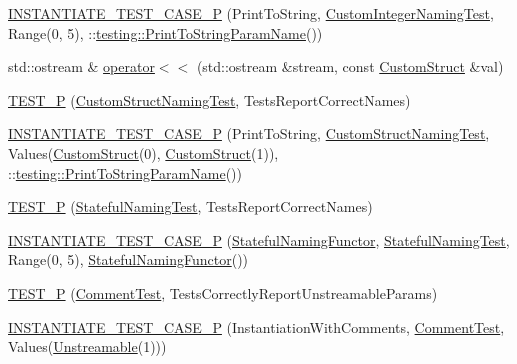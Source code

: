 \begin{DoxyCompactItemize}
\item 
\mbox{\hyperlink{googletest-param-test-test_8cc_a17fa3cbf3d7012f451beed5c2ce6d0d9}{I\+N\+S\+T\+A\+N\+T\+I\+A\+T\+E\+\_\+\+T\+E\+S\+T\+\_\+\+C\+A\+S\+E\+\_\+P}} (Print\+To\+String, \mbox{\hyperlink{classCustomIntegerNamingTest}{Custom\+Integer\+Naming\+Test}}, Range(0, 5), \+::\mbox{\hyperlink{structtesting_1_1PrintToStringParamName}{testing\+::\+Print\+To\+String\+Param\+Name}}())
\item 
std\+::ostream \& \mbox{\hyperlink{googletest-param-test-test_8cc_a9751bdd724ed1a62f98208cf310bc1d9}{operator$<$$<$}} (std\+::ostream \&stream, const \mbox{\hyperlink{structCustomStruct}{Custom\+Struct}} \&val)
\item 
\mbox{\hyperlink{googletest-param-test-test_8cc_a20d9b65a9ff30edb2daf274bc13ba3d7}{T\+E\+S\+T\+\_\+P}} (\mbox{\hyperlink{classCustomStructNamingTest}{Custom\+Struct\+Naming\+Test}}, Tests\+Report\+Correct\+Names)
\item 
\mbox{\hyperlink{googletest-param-test-test_8cc_a4a9392ba30b63ac9cb9c07132cded59e}{I\+N\+S\+T\+A\+N\+T\+I\+A\+T\+E\+\_\+\+T\+E\+S\+T\+\_\+\+C\+A\+S\+E\+\_\+P}} (Print\+To\+String, \mbox{\hyperlink{classCustomStructNamingTest}{Custom\+Struct\+Naming\+Test}}, Values(\mbox{\hyperlink{structCustomStruct}{Custom\+Struct}}(0), \mbox{\hyperlink{structCustomStruct}{Custom\+Struct}}(1)), \+::\mbox{\hyperlink{structtesting_1_1PrintToStringParamName}{testing\+::\+Print\+To\+String\+Param\+Name}}())
\item 
\mbox{\hyperlink{googletest-param-test-test_8cc_a567e8106d701ab56bdc7e610ef119450}{T\+E\+S\+T\+\_\+P}} (\mbox{\hyperlink{classStatefulNamingTest}{Stateful\+Naming\+Test}}, Tests\+Report\+Correct\+Names)
\item 
\mbox{\hyperlink{googletest-param-test-test_8cc_a8758d8486ef133049c7fbd70f070fc13}{I\+N\+S\+T\+A\+N\+T\+I\+A\+T\+E\+\_\+\+T\+E\+S\+T\+\_\+\+C\+A\+S\+E\+\_\+P}} (\mbox{\hyperlink{structStatefulNamingFunctor}{Stateful\+Naming\+Functor}}, \mbox{\hyperlink{classStatefulNamingTest}{Stateful\+Naming\+Test}}, Range(0, 5), \mbox{\hyperlink{structStatefulNamingFunctor}{Stateful\+Naming\+Functor}}())
\item 
\mbox{\hyperlink{googletest-param-test-test_8cc_a5c5935ee04b0f74f29114ed7e1fa2315}{T\+E\+S\+T\+\_\+P}} (\mbox{\hyperlink{classCommentTest}{Comment\+Test}}, Tests\+Correctly\+Report\+Unstreamable\+Params)
\item 
\mbox{\hyperlink{googletest-param-test-test_8cc_a79404c001e02d49160357e904da2eb74}{I\+N\+S\+T\+A\+N\+T\+I\+A\+T\+E\+\_\+\+T\+E\+S\+T\+\_\+\+C\+A\+S\+E\+\_\+P}} (Instantiation\+With\+Comments, \mbox{\hyperlink{classCommentTest}{Comment\+Test}}, Values(\mbox{\hyperlink{classUnstreamable}{Unstreamable}}(1)))

\end{DoxyCompactItemize}
